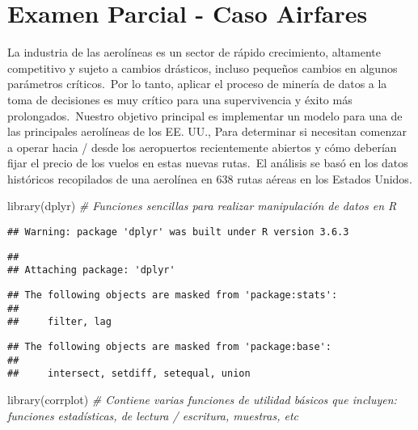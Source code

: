 \documentclass[]{article}
\title{}
\author{}
\date{}
\newenvironment{Shaded}{\begin{snugshade}}{\end{snugshade}}
\newcommand{\CommentTok}[1]{\textcolor[rgb]{0.56,0.35,0.01}{\textit{#1}}}
\newcommand{\FunctionTok}[1]{\textcolor[rgb]{0.00,0.00,0.00}{#1}}
\newcommand{\NormalTok}[1]{#1}
\newcommand{\StringTok}[1]{\textcolor[rgb]{0.31,0.60,0.02}{#1}}
\begin{document}
\hypertarget{examen-parcial---caso-airfares}{%
\section{Examen Parcial - Caso
Airfares}\label{examen-parcial---caso-airfares}}

La industria de las aerolíneas es un sector de rápido crecimiento,
altamente competitivo y sujeto a cambios drásticos, incluso pequeños
cambios en algunos parámetros críticos.~Por lo tanto, aplicar el proceso
de minería de datos a la toma de decisiones es muy crítico para una
supervivencia y éxito más prolongados.~Nuestro objetivo principal es
implementar un modelo para una de las principales aerolíneas de los EE.
UU., Para determinar si necesitan comenzar a operar hacia / desde los
aeropuertos recientemente abiertos y cómo deberían fijar el precio de
los vuelos en estas nuevas rutas.~El análisis se basó en los datos
históricos recopilados de una aerolínea en 638 rutas aéreas en los
Estados Unidos.

\begin{Shaded}
\begin{Highlighting}[]
\FunctionTok{library}\NormalTok{(}\StringTok{\textquotesingle{}dplyr\textquotesingle{}}\NormalTok{) }\CommentTok{\# Funciones sencillas para realizar manipulación de datos en R}
\end{Highlighting}
\end{Shaded}

\begin{verbatim}
## Warning: package 'dplyr' was built under R version 3.6.3
\end{verbatim}

\begin{verbatim}
## 
## Attaching package: 'dplyr'
\end{verbatim}

\begin{verbatim}
## The following objects are masked from 'package:stats':
## 
##     filter, lag
\end{verbatim}

\begin{verbatim}
## The following objects are masked from 'package:base':
## 
##     intersect, setdiff, setequal, union
\end{verbatim}

\begin{Shaded}
\begin{Highlighting}[]
\FunctionTok{library}\NormalTok{(}\StringTok{\textquotesingle{}corrplot\textquotesingle{}}\NormalTok{) }\CommentTok{\# Contiene varias funciones de utilidad básicos que incluyen: funciones estadísticas, de lectura / escritura, muestras, etc}
\end{Highlighting}
\end{Shaded}
\end{document}

